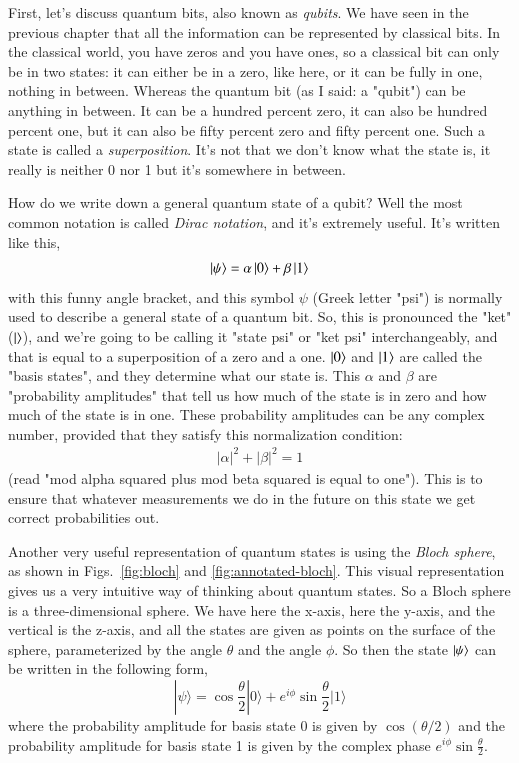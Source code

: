 First, let's discuss quantum bits, also known as \emph{qubits}. We have seen in the previous chapter that all the information can be represented by classical bits. In the classical world, you have zeros and you have ones, so a classical bit can only be in two states: it can either be in a zero, like here, or it can be fully in one, nothing in between. Whereas the quantum bit (as I said: a "qubit") can be anything in between. It can be a hundred percent zero, it can also be hundred percent one, but it can also be fifty percent zero and fifty percent one. Such a state is called a \emph{superposition}. It's not that we don't know what the state is, it really is neither 0 nor 1 but it's somewhere in between.

How do we write down a general quantum state of a qubit? Well the most common notation is called \emph{Dirac notation}, and it's extremely useful. It's written like this,
\begin{align}
\left| \psi \right\rangle = \alpha\left| 0 \right\rangle + \beta\left| 1 \right\rangle
\end{align}
with this funny angle bracket, and this symbol $\psi$ (Greek letter "psi") is normally used to describe a general state of a quantum bit. So, this is pronounced the "ket" ($\left|  \right\rangle$), and we're going to be calling it "state psi" or "ket psi" interchangeably, and that is equal to a superposition of a zero and a one. $\left| 0 \right\rangle$ and $\left| 1 \right\rangle$ are called the "basis states", and they determine what our state is. This $\alpha$ and $\beta$ are "probability amplitudes" that tell us how much of the state is in zero and how much of the state is in one.  These probability amplitudes can be any complex number, provided that they satisfy this normalization condition:
\begin{align}
    |\alpha|^2 + |\beta|^2 = 1
\end{align}
(read "mod alpha squared plus mod beta squared is equal to one"). This is to ensure that whatever measurements we do in the future on this state we get correct probabilities out.

Another very useful representation of quantum states is using the \emph{Bloch sphere}, as shown in Figs.~\ref{fig:bloch} and \ref{fig:annotated-bloch}. This visual representation gives us a very intuitive way of thinking about quantum states. So a Bloch sphere is a three-dimensional sphere. We have here the x-axis, here the y-axis, and the vertical is the z-axis, and all the states are given as points on the surface of the sphere, parameterized by the angle $\theta$ and the angle $\phi$. So then the state $\left| \psi \right\rangle$ can be written in the following form,
\begin{equation}
|\psi\rangle=\cos \frac{\theta}{2}|0\rangle+e^{i \phi} \sin \frac{\theta}{2}|1\rangle
\end{equation}
where the probability amplitude for basis state 0 is given by $\cos(\theta/2)$ and the probability amplitude for basis state 1 is given by the complex phase $e^{i \phi} \sin \frac{\theta}{2}$. 

